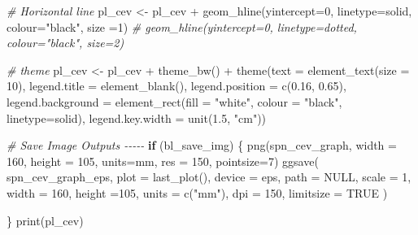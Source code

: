 \documentclass[
]{book}
\newenvironment{Shaded}{\begin{snugshade}}{\end{snugshade}}
\newcommand{\AttributeTok}[1]{\textcolor[rgb]{0.77,0.63,0.00}{#1}}
\newcommand{\CommentTok}[1]{\textcolor[rgb]{0.56,0.35,0.01}{\textit{#1}}}
\newcommand{\ConstantTok}[1]{\textcolor[rgb]{0.00,0.00,0.00}{#1}}
\newcommand{\ControlFlowTok}[1]{\textcolor[rgb]{0.13,0.29,0.53}{\textbf{#1}}}
\newcommand{\DecValTok}[1]{\textcolor[rgb]{0.00,0.00,0.81}{#1}}
\newcommand{\FloatTok}[1]{\textcolor[rgb]{0.00,0.00,0.81}{#1}}
\newcommand{\FunctionTok}[1]{\textcolor[rgb]{0.00,0.00,0.00}{#1}}
\newcommand{\NormalTok}[1]{#1}
\newcommand{\OtherTok}[1]{\textcolor[rgb]{0.56,0.35,0.01}{#1}}
\newcommand{\SpecialCharTok}[1]{\textcolor[rgb]{0.00,0.00,0.00}{#1}}
\newcommand{\StringTok}[1]{\textcolor[rgb]{0.31,0.60,0.02}{#1}}
\begin{document}
\begin{Shaded}
\begin{Highlighting}[]
\CommentTok{\# Horizontal line}
\NormalTok{pl\_cev }\OtherTok{\textless{}{-}}\NormalTok{ pl\_cev }\SpecialCharTok{+}
  \FunctionTok{geom\_hline}\NormalTok{(}\AttributeTok{yintercept=}\DecValTok{0}\NormalTok{, }\AttributeTok{linetype=}\StringTok{\textquotesingle{}solid\textquotesingle{}}\NormalTok{, }\AttributeTok{colour=}\StringTok{"black"}\NormalTok{, }\AttributeTok{size =}\DecValTok{1}\NormalTok{)}
  \CommentTok{\# geom\_hline(yintercept=0, linetype=\textquotesingle{}dotted\textquotesingle{}, colour="black", size=2)}

\CommentTok{\# theme}
\NormalTok{pl\_cev }\OtherTok{\textless{}{-}}\NormalTok{ pl\_cev }\SpecialCharTok{+}
  \FunctionTok{theme\_bw}\NormalTok{() }\SpecialCharTok{+}
  \FunctionTok{theme}\NormalTok{(}\AttributeTok{text =} \FunctionTok{element\_text}\NormalTok{(}\AttributeTok{size =} \DecValTok{10}\NormalTok{),}
       \AttributeTok{legend.title =} \FunctionTok{element\_blank}\NormalTok{(),}
       \AttributeTok{legend.position =} \FunctionTok{c}\NormalTok{(}\FloatTok{0.16}\NormalTok{, }\FloatTok{0.65}\NormalTok{),}
       \AttributeTok{legend.background =} \FunctionTok{element\_rect}\NormalTok{(}\AttributeTok{fill =} \StringTok{"white"}\NormalTok{, }\AttributeTok{colour =} \StringTok{"black"}\NormalTok{, }\AttributeTok{linetype=}\StringTok{\textquotesingle{}solid\textquotesingle{}}\NormalTok{),}
       \AttributeTok{legend.key.width =} \FunctionTok{unit}\NormalTok{(}\FloatTok{1.5}\NormalTok{, }\StringTok{"cm"}\NormalTok{))}


\CommentTok{\# Save Image Outputs {-}{-}{-}{-}{-}}
\ControlFlowTok{if}\NormalTok{ (bl\_save\_img) \{}
  \FunctionTok{png}\NormalTok{(spn\_cev\_graph,}
      \AttributeTok{width =} \DecValTok{160}\NormalTok{,}
      \AttributeTok{height =} \DecValTok{105}\NormalTok{, }\AttributeTok{units=}\StringTok{\textquotesingle{}mm\textquotesingle{}}\NormalTok{,}
      \AttributeTok{res =} \DecValTok{150}\NormalTok{, }\AttributeTok{pointsize=}\DecValTok{7}\NormalTok{)}
  \FunctionTok{ggsave}\NormalTok{(}
\NormalTok{    spn\_cev\_graph\_eps,}
    \AttributeTok{plot =} \FunctionTok{last\_plot}\NormalTok{(),}
    \AttributeTok{device =} \StringTok{\textquotesingle{}eps\textquotesingle{}}\NormalTok{,}
    \AttributeTok{path =} \ConstantTok{NULL}\NormalTok{,}
    \AttributeTok{scale =} \DecValTok{1}\NormalTok{,}
    \AttributeTok{width =} \DecValTok{160}\NormalTok{,}
    \AttributeTok{height =}\DecValTok{105}\NormalTok{,}
    \AttributeTok{units =} \FunctionTok{c}\NormalTok{(}\StringTok{"mm"}\NormalTok{),}
    \AttributeTok{dpi =} \DecValTok{150}\NormalTok{,}
    \AttributeTok{limitsize =} \ConstantTok{TRUE}
\NormalTok{  )}

\NormalTok{\}}
\FunctionTok{print}\NormalTok{(pl\_cev)}
\end{Highlighting}
\end{Shaded}
\end{document}
